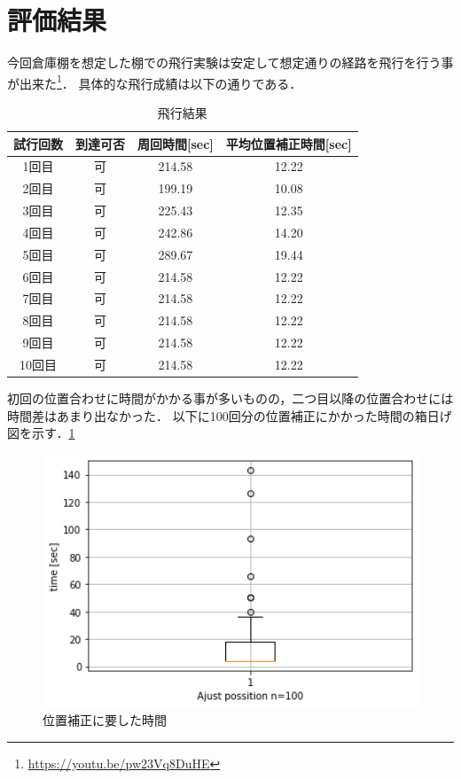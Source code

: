 \section{評価結果}
今回倉庫棚を想定した棚での飛行実験は安定して想定通りの経路を飛行を行う事が出来た\footnote{\url{https://youtu.be/pw23Vq8DuHE}}．
具体的な飛行成績は以下の通りである．

\begin{table}[h]
    \caption{飛行結果}
    \label{table:fly_result}
    \centering
    \begin{tabular}{cccc}
        \hline
        試行回数 & 到達可否 & 周回時間[sec] & 平均位置補正時間[sec] \\
        \hline \hline
        1回目 & 可 & 214.58 & 12.22 \\
        2回目 & 可 & 199.19 & 10.08 \\
        3回目 & 可 & 225.43 & 12.35 \\
        4回目 & 可 & 242.86 & 14.20 \\
        5回目 & 可 & 289.67 & 19.44 \\
        
        6回目 & 可 & 214.58 & 12.22 \\
        7回目 & 可 & 214.58 & 12.22 \\
        8回目 & 可 & 214.58 & 12.22 \\
        9回目 & 可 & 214.58 & 12.22 \\
        10回目 & 可 & 214.58 & 12.22 \\
        \hline
    \end{tabular}
\end{table}

初回の位置合わせに時間がかかる事が多いものの，二つ目以降の位置合わせには時間差はあまり出なかった．
以下に100回分の位置補正にかかった時間の箱日げ図を示す．\ref{box_plot}

\begin{figure}[htbp]
    \begin{center}
      \includegraphics[clip,width=15.0cm]{img/timedata.png}
      \caption{位置補正に要した時間}
      \label{box_plot}
    \end{center}
  \end{figure}